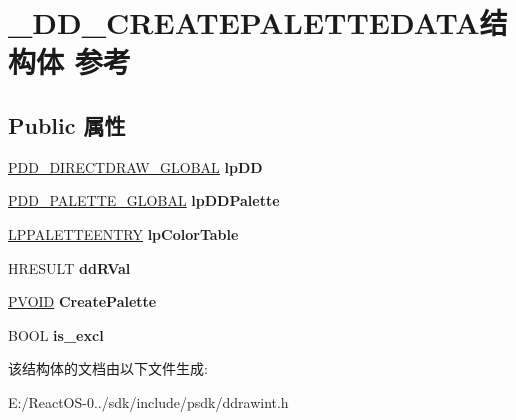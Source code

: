 \hypertarget{struct___d_d___c_r_e_a_t_e_p_a_l_e_t_t_e_d_a_t_a}{}\section{\+\_\+\+D\+D\+\_\+\+C\+R\+E\+A\+T\+E\+P\+A\+L\+E\+T\+T\+E\+D\+A\+T\+A结构体 参考}
\label{struct___d_d___c_r_e_a_t_e_p_a_l_e_t_t_e_d_a_t_a}
\subsection*{Public 属性}
\begin{DoxyCompactItemize}
\item 
\mbox{\label{struct___d_d___c_r_e_a_t_e_p_a_l_e_t_t_e_d_a_t_a_af80c8741da2f730ab5cf798c88f239e2}} 
\hyperlink{struct___d_d___d_i_r_e_c_t_d_r_a_w___g_l_o_b_a_l}{P\+D\+D\+\_\+\+D\+I\+R\+E\+C\+T\+D\+R\+A\+W\+\_\+\+G\+L\+O\+B\+AL} {\bfseries lp\+DD}
\item 
\mbox{\label{struct___d_d___c_r_e_a_t_e_p_a_l_e_t_t_e_d_a_t_a_adf678bf80bf3d5c2eeca9434f078019b}} 
\hyperlink{struct___d_d___p_a_l_e_t_t_e___g_l_o_b_a_l}{P\+D\+D\+\_\+\+P\+A\+L\+E\+T\+T\+E\+\_\+\+G\+L\+O\+B\+AL} {\bfseries lp\+D\+D\+Palette}
\item 
\mbox{\label{struct___d_d___c_r_e_a_t_e_p_a_l_e_t_t_e_d_a_t_a_a744c2c7e7f6ce5cb1840f138e25d0728}} 
\hyperlink{structtag_p_a_l_e_t_t_e_e_n_t_r_y}{L\+P\+P\+A\+L\+E\+T\+T\+E\+E\+N\+T\+RY} {\bfseries lp\+Color\+Table}
\item 
\mbox{\label{struct___d_d___c_r_e_a_t_e_p_a_l_e_t_t_e_d_a_t_a_a7b38d62b7bbed0ecabb1e14a82cb490f}} 
H\+R\+E\+S\+U\+LT {\bfseries dd\+R\+Val}
\item 
\mbox{\label{struct___d_d___c_r_e_a_t_e_p_a_l_e_t_t_e_d_a_t_a_a2d3bf7ebd7424b0c020fced256df036c}} 
\hyperlink{interfacevoid}{P\+V\+O\+ID} {\bfseries Create\+Palette}
\item 
\mbox{\label{struct___d_d___c_r_e_a_t_e_p_a_l_e_t_t_e_d_a_t_a_a1ccf936310c469842edd47115c581059}} 
B\+O\+OL {\bfseries is\+\_\+excl}
\end{DoxyCompactItemize}


该结构体的文档由以下文件生成\+:\begin{DoxyCompactItemize}
\item 
E\+:/\+React\+O\+S-\/0../sdk/include/psdk/ddrawint.\+h\end{DoxyCompactItemize}
